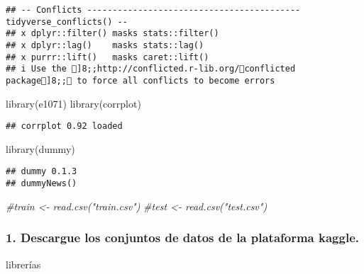 \documentclass[
]{article}
\newenvironment{Shaded}{\begin{snugshade}}{\end{snugshade}}
\newcommand{\CommentTok}[1]{\textcolor[rgb]{0.56,0.35,0.01}{\textit{#1}}}
\newcommand{\FunctionTok}[1]{\textcolor[rgb]{0.00,0.00,0.00}{#1}}
\newcommand{\NormalTok}[1]{#1}
\begin{document}
\begin{verbatim}
## -- Conflicts ------------------------------------------ tidyverse_conflicts() --
## x dplyr::filter() masks stats::filter()
## x dplyr::lag()    masks stats::lag()
## x purrr::lift()   masks caret::lift()
## i Use the ]8;;http://conflicted.r-lib.org/conflicted package]8;; to force all conflicts to become errors
\end{verbatim}

\begin{Shaded}
\begin{Highlighting}[]
\FunctionTok{library}\NormalTok{(e1071)}
\FunctionTok{library}\NormalTok{(corrplot)}
\end{Highlighting}
\end{Shaded}

\begin{verbatim}
## corrplot 0.92 loaded
\end{verbatim}

\begin{Shaded}
\begin{Highlighting}[]
\FunctionTok{library}\NormalTok{(dummy)}
\end{Highlighting}
\end{Shaded}

\begin{verbatim}
## dummy 0.1.3
## dummyNews()
\end{verbatim}

\begin{Shaded}
\begin{Highlighting}[]
\CommentTok{\#train \textless{}{-} read.csv("train.csv")}
\CommentTok{\#test \textless{}{-} read.csv("test.csv")}
\end{Highlighting}
\end{Shaded}

\hypertarget{descargue-los-conjuntos-de-datos-de-la-plataforma-kaggle.}{%
\subsubsection{1. Descargue los conjuntos de datos de la plataforma
kaggle.}\label{descargue-los-conjuntos-de-datos-de-la-plataforma-kaggle.}}

librerías
\end{document}
